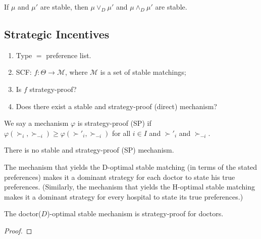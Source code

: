 \documentclass[11pt]{elegantbook}
\begin{document}
\begin{theorem}
    If $\mu$ and $\mu'$ are stable, then $\mu\vee_D\mu'$ and $\mu\wedge_D\mu'$ are stable.
\end{theorem}

\subsection{Strategic Incentives}
\begin{enumerate}[$\circ$]
    \item Type $=$ preference list.
    \item SCF: $f: \Theta \rightarrow \mathcal{M}$, where $\mathcal{M}$ is a set of stable matchings;
    \item Is $f$ strategy-proof?
    \item Does there exist a stable and strategy-proof (direct) mechanism?
\end{enumerate}

\begin{definition}
    \normalfont
    We say a mechanism $\varphi$ is strategy-proof (SP) if $\varphi(\succ_i,\succ_{-i})\geq \varphi (\succ'_i,\succ_{-i})$ for all $i\in I$ and $\succ'_i$ and $\succ_{-i}$.
\end{definition}

\begin{theorem}
    There is no stable and strategy-proof (SP) mechanism.
\end{theorem}

The mechanism that yields the D-optimal stable matching (in terms of the stated preferences) makes it a dominant strategy for each doctor to state his true preferences. (Similarly, the mechanism that yields the H-optimal stable matching makes it a dominant strategy for every hospital to state its true preferences.)
\begin{theorem}
    The doctor($D$)-optimal stable mechanism is strategy-proof for doctors.
\end{theorem}
\begin{proof}
\end{proof}
\end{document}
